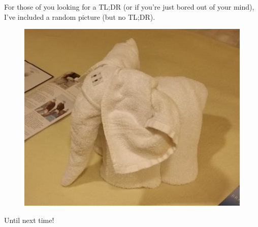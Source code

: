 For those of you looking for a TL;DR (or if you're just bored out of your mind), I've included a random picture (but no TL;DR).

\begin{figure}[H]
	\centering
	\includegraphics[width=0.5\linewidth]{./images/blog-series/xmr-crypto-luigi1111/rand-image.jpg}
\end{figure}

Until next time!

